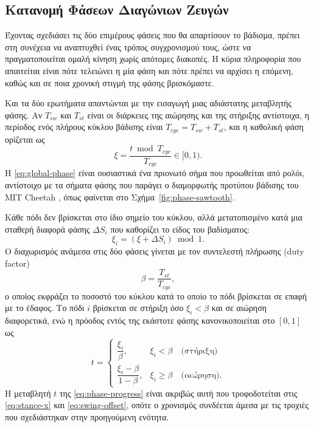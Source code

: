 \documentclass[11pt]{report}
\begin{document}
\subsection{Κατανομή Φάσεων Διαγώνιων Ζευγών}
\label{subsec:gait-timing}
Έχοντας σχεδιάσει τις δύο επιμέρους φάσεις που θα απαρτίσουν το βάδισμα, πρέπει
στη συνέχεια να αναπτυχθεί ένας τρόπος συγχρονισμού τους, ώστε να
πραγματοποιείται ομαλή κίνηση χωρίς απότομες διακοπές. Η κύρια πληροφορία που
απαιτείται είναι πότε τελειώνει η μία φάση και πότε πρέπει να αρχίσει η επόμενη,
καθώς και σε ποια χρονική στιγμή της φάσης βρισκόμαστε.

Και τα δύο ερωτήματα απαντώνται με την εισαγωγή μιας αδιάστατης μεταβλητής
φάσης. Αν $T_{sw}$ και $T_{st}$ είναι οι διάρκειες της αιώρησης και της
στήριξης αντίστοιχα, η περίοδος ενός πλήρους κύκλου βάδισης είναι
$T_{cyc} = T_{sw} + T_{st}$, και η καθολική φάση ορίζεται ως
\begin{equation}
\xi = \frac{t \bmod T_{cyc}}{T_{cyc}} \in [0,1).
\label{eq:global-phase}
\end{equation}
Η \eqref{eq:global-phase} είναι ουσιαστικά ένα πριονωτό σήμα που προωθείται από
ρολόι, αντίστοιχο με τα σήματα φάσης που παράγει ο διαμορφωτής προτύπου
βάδισης του MIT Cheetah \cite{hyun_high_2014}, όπως φαίνεται στο
Σχήμα~\ref{fig:phase-sawtooth}.

Κάθε πόδι δεν βρίσκεται στο ίδιο σημείο του κύκλου, αλλά μετατοπισμένο κατά μια
σταθερή διαφορά φάσης $\Delta S_i$ που καθορίζει το είδος του βαδίσματος:
\begin{equation}
\xi_i = \left(\xi + \Delta S_i\right) \bmod 1.
\label{eq:leg-phase}
\end{equation}
Ο διαχωρισμός ανάμεσα στις δύο φάσεις γίνεται με τον συντελεστή πλήρωσης (duty
factor)
\begin{equation}
\beta = \frac{T_{st}}{T_{cyc}},
\label{eq:duty-factor}
\end{equation}
ο οποίος εκφράζει το ποσοστό του κύκλου κατά το οποίο το πόδι βρίσκεται σε
επαφή με το έδαφος. Το πόδι $i$ βρίσκεται σε στήριξη όσο $\xi_i < \beta$ και σε
αιώρηση διαφορετικά, ενώ η πρόοδος εντός της εκάστοτε φάσης κανονικοποιείται
στο $[0,1]$ ως
\begin{equation}
t =
\begin{cases}
\dfrac{\xi_i}{\beta}, & \xi_i < \beta \quad \text{(στήριξη)} \\[10pt]
\dfrac{\xi_i - \beta}{1 - \beta}, & \xi_i \geq \beta \quad \text{(αιώρηση)}.
\end{cases}
\label{eq:phase-progress}
\end{equation}
Η μεταβλητή $t$ της \eqref{eq:phase-progress} είναι ακριβώς αυτή που
τροφοδοτείται στις \eqref{eq:stance-x} και \eqref{eq:swing-offset}, οπότε ο
χρονισμός συνδέεται άμεσα με τις τροχιές που σχεδιάστηκαν στην προηγούμενη
ενότητα.
\end{document}
